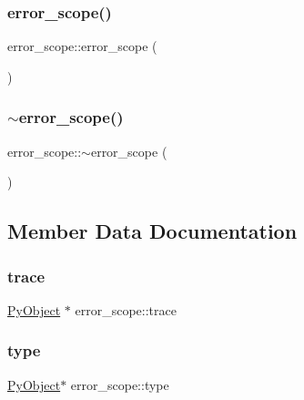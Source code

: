 \subsubsection{\texorpdfstring{error\_scope()}{error\_scope()}}
{\footnotesize\ttfamily error\+\_\+scope\+::error\+\_\+scope (\begin{DoxyParamCaption}{ }\end{DoxyParamCaption})\hspace{0.3cm}{\ttfamily [inline]}}

\mbox{\label{structerror__scope_adf7d91c85c84bb66dbb58a228e2c3d3e}} 
\subsubsection{\texorpdfstring{$\sim$error\_scope()}{~error\_scope()}}
{\footnotesize\ttfamily error\+\_\+scope\+::$\sim$error\+\_\+scope (\begin{DoxyParamCaption}{ }\end{DoxyParamCaption})\hspace{0.3cm}{\ttfamily [inline]}}



\subsection{Member Data Documentation}
\mbox{\label{structerror__scope_abdf5b7a557de4eae94a9b5d30ae7de00}} 
\subsubsection{\texorpdfstring{trace}{trace}}
{\footnotesize\ttfamily \mbox{\hyperlink{_python27_2object_8h_aadc84ac7aed2cfa6f20c25f62bf3dac7}{Py\+Object}} $\ast$ error\+\_\+scope\+::trace}

\mbox{\label{structerror__scope_a79197309ef17cd8e22f6d1ab931126d9}} 
\subsubsection{\texorpdfstring{type}{type}}
{\footnotesize\ttfamily \mbox{\hyperlink{_python27_2object_8h_aadc84ac7aed2cfa6f20c25f62bf3dac7}{Py\+Object}}$\ast$ error\+\_\+scope\+::type}

